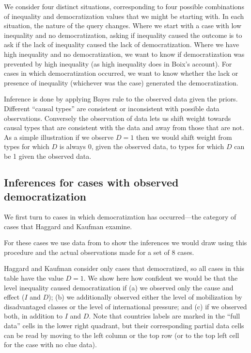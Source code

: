 \documentclass[
  12pt,
]{book}
\begin{document}
We consider four distinct situations, corresponding to four possible combinations of inequality and democratization values that we might be starting with. In each situation, the nature of the query changes. Where we start with a case with low inequality and no democratization, asking if inequality caused the outcome is to ask if the lack of inequality caused the lack of democratization. Where we have high inequality and no democratization, we want to know if democratization was prevented by high inequality (as high inequality does in Boix's account). For cases in which democratization occurred, we want to know whether the lack or presence of inequality (whichever was the case) generated the democratization.

Inference is done by applying Bayes rule to the observed data given the priors. Different ``causal types'' are consistent or inconsistent with possible data observations. Conversely the observation of data lets us shift weight towards causal types that are consistent with the data and away from those that are not. As a simple illustration if we observe \(D=1\) then we would shift weight from types for which \(D\) is always 0, given the observed data, to types for which \(D\) can be 1 given the observed data.

\hypertarget{inferences-for-cases-with-observed-democratization}{%
\subsection{Inferences for cases with observed democratization}\label{inferences-for-cases-with-observed-democratization}}

We first turn to cases in which democratization has occurred---the category of cases that Haggard and Kaufman examine.

For these cases we use data from \citet{haggard2012inequality} to show the inferences we would draw using this procedure and the actual observations made for a set of 8 cases.

Haggard and Kaufman consider only cases that democratized, so all cases in this table have the value \(D=1\). We show here how confident we would be that the level inequality caused democratization if (a) we observed only the cause and effect (\(I\) and \(D\)); (b) we additionally observed either the level of mobilization by disadvantaged classes or the level of international pressure; and (c) if we observed both, in addition to \(I\) and \(D\). Note that countries labels are marked in the ``full data'' cells in the lower right quadrant, but their corresponding partial data cells can be read by moving to the left column or the top row (or to the top left cell for the case with no clue data).
\end{document}

